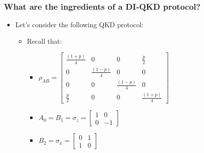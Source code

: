 \documentclass{beamer}
\begin{document}
		\begin{frame}
			\frametitle{\large What are the ingredients of a DI‑QKD protocol?}

            \vspace{2.5ex}
            \begin{itemize}
                \item Let's consider the following QKD protocol:
                \begin{itemize}
                    \item Recall that:
                    \vspace{2ex}
                    \begin{itemize}
                        \item ${\rho}_{AB} = \begin{bmatrix}
                            \frac{(1 + p)}{4} & 0 & 0 & \frac{p}{2}\\
                            0 & \frac{(1 - p)}{4} & 0 & 0\\
                            0 & 0 & \frac{(1 - p)}{4} & 0\\
                            \frac{p}{2} & 0 & 0 & \frac{(1 + p)}{4}
                        \end{bmatrix}$
                    \end{itemize}
                    \hspace*{-7.5ex}
                    \begin{minipage}{0.5\textwidth}
                        \begin{itemize}
                            \item ${A}_{0} = {B}_{1} = {\sigma}_{z} =
                            \begin{bmatrix}
                                1 &  0 \\
                                0 & -1
                            \end{bmatrix}$
                            \vspace{2ex}
                            \item ${B}_{2} = {\sigma}_{x} = \begin{bmatrix}
                                0 & 1 \\
                                1 & 0
                            \end{bmatrix}$
                        \end{itemize}
                    \end{minipage}%

\end{itemize}
\end{itemize}
\end{frame}
\end{document}
